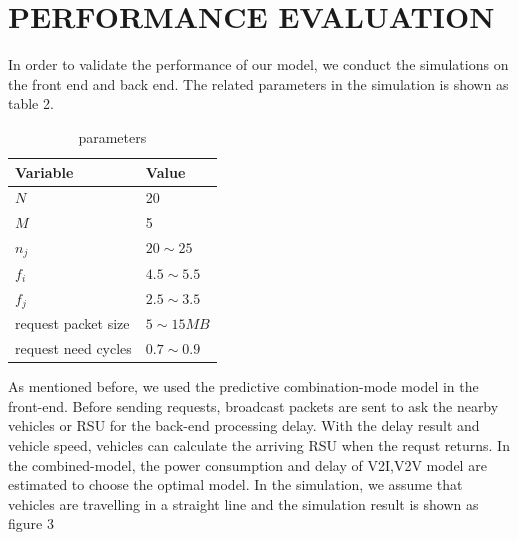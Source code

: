 \documentclass[twoside,twocolumn]{article}
\begin{document}
\section{PERFORMANCE EVALUATION}
In order to validate the performance of our model, we conduct the simulations on the front end and back end. The related parameters in the simulation is shown as table 2.
\begin{table}[h]
	\centering
	\begin{tabular}{p{3cm}p{3cm}}
	\hline
	Variable & Value \\\hline   
	$N$             & 20\\
	$M$             & 5\\
	$n_j$           & $20\sim25$ \\
	$f_i$           & $4.5\sim5.5$ \\
	$f_j$           & $2.5\sim3.5$ \\
	request packet size & $5\sim15MB$ \\
	request need cycles & $0.7\sim0.9$ \\\hline
	\end{tabular}
	\caption{parameters}
\end{table}

As mentioned before, we used the predictive combination-mode model in the front-end. Before sending requests, broadcast packets are sent to ask the nearby vehicles or RSU for the back-end processing delay. With the delay result and vehicle speed, vehicles can calculate the arriving RSU when the requst returns. In the combined-model, the power consumption and delay of V2I,V2V model are estimated to choose the optimal model. In the simulation, we assume that vehicles are travelling in a straight line and the simulation result is shown as figure 3

\begin{figure}[ht] 
  \centering 
  \caption{} 
\end{figure}
\end{document}
